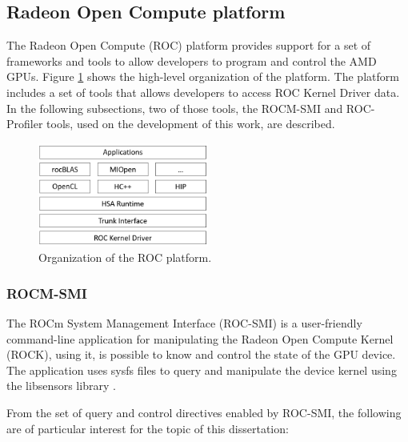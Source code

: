 \subsection{Radeon Open Compute platform}

The Radeon Open Compute (ROC) \cite{noauthor_radeonopencompute/rocm_2019} platform provides support for a set of frameworks and tools to allow developers to program and control the AMD GPUs. Figure \ref{fig:rocmplatform} shows the high-level organization of the platform. The platform includes a set of tools that allows developers to access ROC Kernel Driver data. In the following subsections, two of those tools, the ROCM-SMI \cite{noauthor_radeonopencompute/roc-smi_2019} and ROC-Profiler \cite{noauthor_rocm-developer-tools/rocprofiler_2019} tools, used on the development of this work, are described.

\begin{figure}[!htb]
  \centering
  \includegraphics[width=0.5\textwidth]{Figures/StateArt/rocStack.png}
  \caption{Organization of the ROC platform.}
  \label{fig:rocmplatform}
\end{figure}

\subsubsection{ROCM-SMI}
The ROCm System Management Interface (ROC-SMI) \cite{noauthor_radeonopencompute/roc-smi_2019} is a user-friendly command-line application for manipulating the Radeon Open Compute Kernel (ROCK),  using it, is possible to know and control the state of the GPU device. The application uses sysfs files to query and manipulate the device kernel using the libsensors library \cite{noauthor_libsensors3:_nodate}.

From the set of query and control directives enabled by ROC-SMI, the following are of particular interest for the topic of this dissertation:


